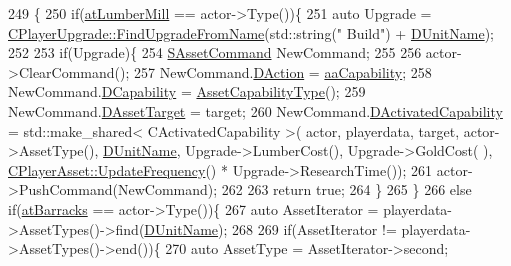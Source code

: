 \begin{DoxyCode}
249                                                                                                            
                                                               \{
250     \textcolor{keywordflow}{if}(\hyperlink{GameDataTypes_8h_a5600d4fc433b83300308921974477feca7bb38316bc3193b5c9ec67ea6aad549c}{atLumberMill} == actor->Type())\{
251         \textcolor{keyword}{auto} Upgrade = \hyperlink{classCPlayerUpgrade_af47a08aba3a1a5b2cefacef24065a82e}{CPlayerUpgrade::FindUpgradeFromName}(std::string(\textcolor{stringliteral}{"
      Build"}) + \hyperlink{classCPlayerCapabilityBuildRanger_a4e85674699365fe1e77bcb2a1996d7ba}{DUnitName});
252         
253         \textcolor{keywordflow}{if}(Upgrade)\{
254             \hyperlink{structSAssetCommand}{SAssetCommand} NewCommand;
255             
256             actor->ClearCommand();
257             NewCommand.\hyperlink{structSAssetCommand_a8edd3b3d59a76d5514ba403bc8076a75}{DAction} = \hyperlink{GameDataTypes_8h_ab47668e651a3032cfb9c40ea2d60d670acf9fb164e8abd71c71f4a8c7fda360d4}{aaCapability};
258             NewCommand.\hyperlink{structSAssetCommand_a734ea7c6847457b437360f333f570ff9}{DCapability} = \hyperlink{classCPlayerCapability_a433bb196cd6ab6a932f1cac102b3aa98}{AssetCapabilityType}();
259             NewCommand.\hyperlink{structSAssetCommand_a3d9b43f6e59c386c48c41a65448a0c39}{DAssetTarget} = target;
260             NewCommand.\hyperlink{structSAssetCommand_ad8beda19520811cc70fe1eab16c774dd}{DActivatedCapability} = std::make\_shared< CActivatedCapability >(
      actor, playerdata, target, actor->AssetType(), \hyperlink{classCPlayerCapabilityBuildRanger_a4e85674699365fe1e77bcb2a1996d7ba}{DUnitName}, Upgrade->LumberCost(), Upgrade->GoldCost(
      ), \hyperlink{classCPlayerAsset_a0aff85b9552967a42f4f3f42cb59c19f}{CPlayerAsset::UpdateFrequency}() * Upgrade->ResearchTime());
261             actor->PushCommand(NewCommand);
262             
263             \textcolor{keywordflow}{return} \textcolor{keyword}{true};
264         \}
265     \}
266     \textcolor{keywordflow}{else} \textcolor{keywordflow}{if}(\hyperlink{GameDataTypes_8h_a5600d4fc433b83300308921974477feca1cbf6c944f30d615a247eef1f57b2230}{atBarracks} == actor->Type())\{
267         \textcolor{keyword}{auto} AssetIterator = playerdata->AssetTypes()->find(\hyperlink{classCPlayerCapabilityBuildRanger_a4e85674699365fe1e77bcb2a1996d7ba}{DUnitName});
268         
269         \textcolor{keywordflow}{if}(AssetIterator != playerdata->AssetTypes()->end())\{
270             \textcolor{keyword}{auto} AssetType = AssetIterator->second;

\end{DoxyCode}
